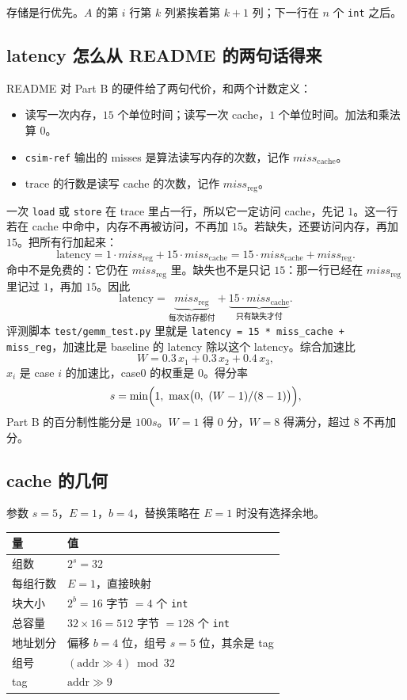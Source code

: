 \documentclass[11pt,a4paper,fontset=fandol]{ctexart}
\newcommand{\code}[1]{\texttt{#1}}
\newcommand{\mreg}{\mathit{miss}_{\mathrm{reg}}}
\newcommand{\mc}{\mathit{miss}_{\mathrm{cache}}}
\begin{document}
存储是行优先。$A$ 的第 $i$ 行第 $k$ 列紧挨着第 $k+1$ 列；下一行在 $n$ 个 \code{int} 之后。

\subsection{latency 怎么从 README 的两句话得来}
\label{sec:latency}

README 对 Part B 的硬件给了两句代价，和两个计数定义：

\begin{itemize}
  \item 读写一次内存，$15$ 个单位时间；读写一次 cache，$1$ 个单位时间。加法和乘法算 $0$。
  \item \code{csim-ref} 输出的 misses 是算法读写内存的次数，记作 $\mc$。
  \item trace 的行数是读写 cache 的次数，记作 $\mreg$。
\end{itemize}

一次 \code{load} 或 \code{store} 在 trace 里占一行，所以它一定访问 cache，先记 $1$。这一行若在 cache 中命中，内存不再被访问，不再加 $15$。若缺失，还要访问内存，再加 $15$。把所有行加起来：
\begin{equation}
\label{eq:lat}
\mathrm{latency}=1\cdot\mreg+15\cdot\mc=15\cdot\mc+\mreg.
\end{equation}
命中不是免费的：它仍在 $\mreg$ 里。缺失也不是只记 $15$：那一行已经在 $\mreg$ 里记过 $1$，再加 $15$。因此
\[
\mathrm{latency}=\underbrace{\mreg}_{\text{每次访存都付}}+\underbrace{15\cdot\mc}_{\text{只有缺失才付}}.
\]
评测脚本 \code{test/gemm\_test.py} 里就是 \code{latency = 15 * miss\_cache + miss\_reg}，加速比是 baseline 的 latency 除以这个 latency。综合加速比
\[
W=0.3\,x_1+0.3\,x_2+0.4\,x_3,
\]
$x_i$ 是 case $i$ 的加速比，case0 的权重是 $0$。得分率
\[
s=\min\Bigl(1,\ \max\bigl(0,\ (W-1)/(8-1)\bigr)\Bigr),
\]
Part B 的百分制性能分是 $100s$。$W=1$ 得 $0$ 分，$W=8$ 得满分，超过 $8$ 不再加分。

\subsection{cache 的几何}
\label{sec:cache}

参数 $s=5$，$E=1$，$b=4$，替换策略在 $E=1$ 时没有选择余地。

\begin{center}
\begin{tabular}{@{}ll@{}}
\toprule
量 & 值\\
\midrule
组数 & $2^s=32$\\
每组行数 & $E=1$，直接映射\\
块大小 & $2^b=16$ 字节 $=4$ 个 \code{int}\\
总容量 & $32\times 16=512$ 字节 $=128$ 个 \code{int}\\
地址划分 & 偏移 $b=4$ 位，组号 $s=5$ 位，其余是 tag\\
组号 & $(\mathrm{addr}\gg 4)\bmod 32$\\
tag & $\mathrm{addr}\gg 9$\\
\bottomrule
\end{tabular}
\end{center}
\end{document}
